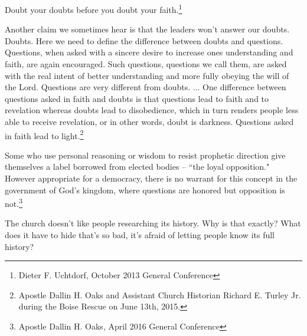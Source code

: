 \begin{displayquote}
Doubt your doubts before you doubt your faith.\footnote{Dieter F. Uchtdorf, 
October 2013 General Conference}
\end{displayquote}

\begin{displayquote}
Another claim we sometimes hear is that the leaders won’t answer our doubts. Doubts.
Here we need to define the difference between doubts and questions. Questions, when
asked with a sincere desire to increase ones understanding and faith, are again
encouraged. Such questions, questions we call them, are asked with the real intent of
better understanding and more fully obeying the will of the Lord. Questions are very
different from doubts. ... One difference between questions asked in faith and doubts
is that questions lead to faith and to revelation whereas doubts lead to
disobedience, which in turn renders people less able to receive revelation, or in
other words, doubt is darkness. Questions asked in faith lead to light.\footnote{
Apostle Dallin H. Oaks and Assistant Church Historian Richard E. Turley Jr. 
during the Boise Rescue on June 13th, 2015.
}
\end{displayquote}

\begin{displayquote}
Some who use personal reasoning or wisdom to resist prophetic direction give
themselves a label borrowed from elected bodies -- ``the loyal opposition." However
appropriate for a democracy, there is no warrant for this concept in the government
of God’s kingdom, where questions are honored but opposition is not.\footnote{
Apostle Dallin H. Oaks, April 2016 General Conference
}
\end{displayquote}

The church doesn't like people researching its history. Why is that exactly? What
does it have to hide that's so bad, it's afraid of letting people know its full
history?